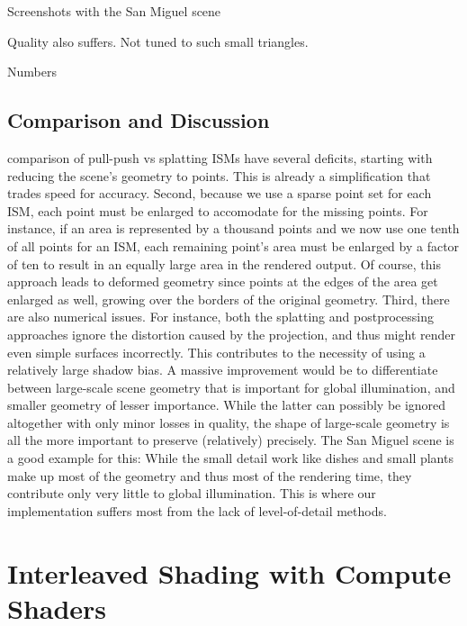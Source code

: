 Screenshots with the San Miguel scene

Quality also suffers. Not tuned to such small triangles.

Numbers

\subsection{Comparison and Discussion}
\begin{outline}
    \1 comparison of pull-push vs splatting
    \1 ISMs have several deficits, starting with reducing the scene's geometry to points. This is already a simplification that trades speed for accuracy.
    \1 Second, because we use a sparse point set for each ISM, each point must be enlarged to accomodate for the missing points. For instance, if an area is represented by a thousand points and we now use one tenth of all points for an ISM, each remaining point's area must be enlarged by a factor of ten to result in an equally large area in the rendered output. Of course, this approach leads to deformed geometry since points at the edges of the area get enlarged as well, growing over the borders of the original geometry.
    \1 Third, there are also numerical issues. For instance, both the splatting and postprocessing approaches ignore the distortion caused by the projection, and thus might render even simple surfaces incorrectly. This contributes to the necessity of using a relatively large shadow bias.
    \1 A massive improvement would be to differentiate between large-scale scene geometry that is important for global illumination, and smaller geometry of lesser importance. While the latter can possibly be ignored altogether with only minor losses in quality, the shape of large-scale geometry is all the more important to preserve (relatively) precisely.
    \1 The San Miguel scene is a good example for this: While the small detail work like dishes and small plants make up most of the geometry and thus most of the rendering time, they contribute only very little to global illumination. This is where our implementation suffers most from the lack of level-of-detail methods.
\end{outline}





\section{Interleaved Shading with Compute Shaders}

